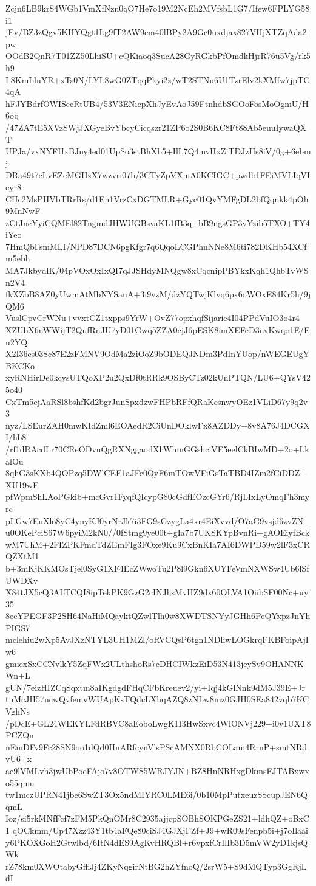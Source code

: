 Zcjn6LB9krS4WGb1VmXfNzn0qO7He7o19M2NcEh2MVfsbL1G7/Ifew6FPLYG58i1
jEv/BZ3zQgv5KHYQgt1Lg9fT2AW9cm40lBPy2A9Gc0uxdjax827VHjXTZqAda2pw
OOdB2QnR7T01ZZ50LhiSU+cQKiaoq3SucA28GyRGkbPfOmdkHjrR76u5Vg/rk5h9
L8KmLluYR+xTs0N/LYL8wG0ZTqqPkyi2z/wT2STNu6U1TzrElv2kXMfw7jpTC4qA
hFJYBdrfOWISecRtUB4/53V3ENicpXhJyEvAoJ59FtnhdbSGOoFosMoOgmU/H6oq
/47ZA7tE5XVzSWjJXGyeBvYbcyCicqszr21ZP6o2S0B6KC8Ft88Ab5euuIywaQXT
UPJa/vxNYFHxBJny4ed01UpSo3stBhXb5+IlL7Q4mvHxZiTDJzHs8iV/0g+6ebmj
DRa49t7cLvEZeMGHzX7wzvri07b/3CTyZpVXmA0KCIGC+pwdb1FEiMVLIqVIcyr8
CHc2MsPHVbTRrRs/d1En1VrzCxDGTMLR+Gyc01QvYMFgDL2bfQqnkk4pOh9MnNwF
zCtJneYyiCQMEl82TngmdJHWUGBsvaKL1fB3q+bB9ngsGP3vYzib5TXO+TY4iYeo
7HmQbFsmMLI/NPD87DCN6pgKfgr7q6QqoLCGPhnNNe8M6ti782DKHb54XCfm5ebh
MA7JkbydlK/04pVOxOxIxQI7qJJSHdyMNQgw8xCqcnipPBYkxKqh1QhbTvWSn2V4
fkXZbB8AZ0yUwmAtMbNYSanA+3i9vzM/dzYQTwjKlvq6px6oWOxE84Kr5h/9jQM6
VuslCpvCrWNu+vvxtCZ1txpps9YrW+OvZ77opxhqfSijarie4I04PPdVuIO3o4r4
XZUbX6nWWijT2QufRnJU7yD01Gwq5ZZA0cjJ6pESK8imXEFeD3nvKwqo1E/Eu2YQ
X2I36es03Sc87E2zFMNV9OdMa2ziOoZ9bODEQJNDm3PdInYUop/nWEGEUgYBKCKo
xyRNHirDe0kcysUTQoXP2u2QxDf0tRRk9OSByCTz02kUnPTQN/LU6+QYsV425o40
CxTm5cjAaRSl8bshfKd2bgrJunSpxdzwFHPbRFfQRaKesnwyOEz1VLiD67y9q2v3
nyz/LSEurZAH0mwKIdZml6EOAedR2CiUnDOklwFx8AZDDy+8v8A76J4DCGXI/hb8
/rf1dRAcdLr70CReODvuQgRXNggaodXhWhmGGshciVE5eelCkBIwMD+2o+LkalOu
8qhG3sKXb4QOPzq5DWlCEE1aJFe0QyF6mTOwVFiGsTaTBD4IZm2fCiDDZ+XU19wF
pfWpmShLAoPGkib+mcGvr1FyqfQIcypG80cGdfEOzcGYr6/RjLIxLyOmqFh3myrc
pLGw7EuXlo8yC4ynyKJ0yrNrJk7i3FG9sGzygLa4xr4EiXvvd/O7aG9vsjd6zvZN
u0OKePciS67W6pyiM2kN0//0fStmg9ye00t+gIa7b7UKSKYpBvnRi+gAOEiyfBck
wM7UhM+2FIZPKFmdTdZEmFIg3FOxe9Ku9CxBnKIa7AI6DWPD59w2lF3xCRQZXtM1
b+3mKjKKMOsTjel0SyG1XF4EcZWwoTu2P8l9Gkn6XUYFeVmNXWSw4Ub6lSfUWDXv
X84tJX5cQ3ALTCQI8ipTekPK9GzG2cINJhsMvHZ9dx60OLVA1OiibSF00Nc+uy35
8eeYPEGF3P2SH64NaHiMQayktQZwlTlh0w8XWDTSNYyJGHh6PeQYxpzJnYhPIGS7
mclehiu2wXp5AvJXzNTYL3UH1MZl/oRVCQsP6tgn1NDliwLOGkrqFKBFoipAjIw6
gmiexSxCCNvlkY5ZqFWx2ULthshoRs7cDHCIWkzEiD53N413jcySv9OHANNKWn+L
gUN/7eizHIZCqSqxtm8aIKgdgdFHqCFbKreuev2/yi+Iqj4kGlNnk9dM5J39E+Jr
tuMcJH57ucwQvfemvWUApKsTQdcLXhqAZQ8zNLw8mz0GJH0SEa842vqb7KCVghNs
/pDcE+GL24WEKYLFdRBVC8aEoboLwgK1I3HwSxvc4WlONVj229+i0v1UXT8PCZQn
nEmDFv9Fc28SN9oo1dQd0HnARfcynVlsPScAMNX0RbCOLam4RrnP+smtNRdvU6+x
ae9lVMLvh3jwUbPocFAjo7v8OTWS5WRJYJN+BZ8HnNRHxgDkmsFJTABxwxo55qmu
tw1mczUPRN41jbe6SwZT3Ox5ndMIYRC0LME6i/0b10MpPutxeuzSScupJEN6QqmL
Ioz/si5rkMNfFcf7zFM5PkQnOMr8C2935ajjcpSOBhSOKPGeZS21+ldhQZ+oBxC1
qOCkmm/Up47Xzz43Y1tb4aFQe80ciSJ4GJXjFZf+J9+wR09sFenpb5i+j7oIlaai
y6PKOXGoH2Gtwlbd/6ItN4dES9AgKvHRQBl+r6vpxfCrIlIb3D5mVW2yD1kjsQWk
rZ78km0XWOtabyGfflJj4ZKyNqgirNtBG2hZYfnoQ/2srW5+S9dMQTyp3GgRjLdI
